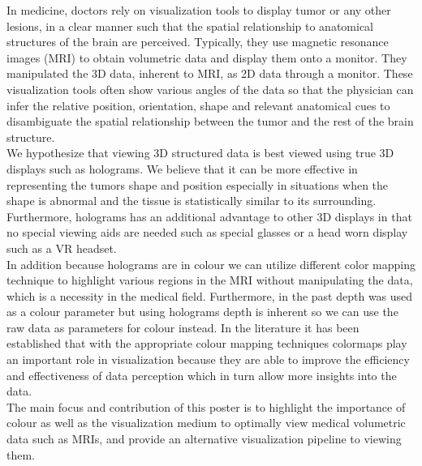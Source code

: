In medicine, doctors rely on visualization tools to display tumor or any other lesions, in a clear manner such that the spatial relationship to anatomical structures of the brain are perceived.  Typically, they use magnetic resonance images (MRI) to obtain volumetric data and display them onto a monitor.  They manipulated the 3D data, inherent to MRI, as 2D data through a monitor.  These visualization tools often show various angles of the data so that the physician can infer the relative position, orientation, shape and relevant anatomical cues to disambiguate the spatial relationship between the tumor and the rest of the brain structure.\\

We hypothesize that viewing 3D structured data is best viewed using true 3D displays such as holograms. We believe that it can be more effective in representing the tumors shape and position especially in situations when the shape is abnormal and the tissue is statistically similar to its surrounding.  Furthermore, holograms has an additional advantage to other 3D displays in that  no special viewing aids are needed such as special glasses or a head worn display such as a VR headset.  \\

In addition because holograms are in colour we can utilize different color mapping technique to highlight various regions in the MRI without manipulating the data, which is a necessity in the medical field.  Furthermore, in the past depth was used as a colour parameter but using holograms depth is inherent so we can use the raw data as parameters for colour instead. In the literature it has been established that with the appropriate colour mapping techniques colormaps play an important role in visualization because they are able to improve the efficiency and effectiveness of data perception which in turn allow more insights into the data.\\  

The main focus and contribution of this poster is to highlight the importance of colour as well as the visualization medium to optimally view medical volumetric data such as MRIs, and provide an alternative visualization pipeline to viewing them.

